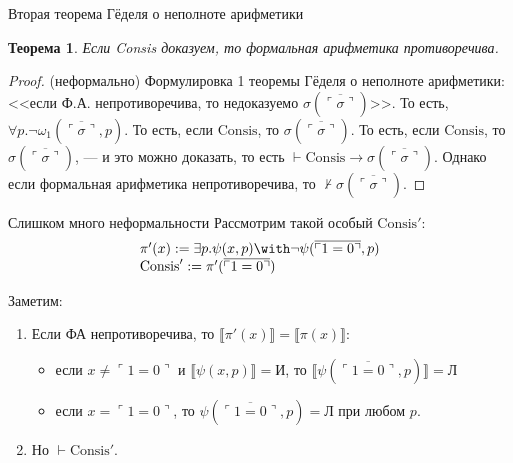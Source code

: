 \documentclass[aspectratio=169]{beamer}
\newtheorem{thm}{Теорема}[section]
\begin{document}
\begin{frame}{Вторая теорема Гёделя о неполноте арифметики}
\begin{thm}Если Consis доказуем, то формальная арифметика противоречива.\end{thm}
\begin{proof}(неформально) \pause
Формулировка 1 теоремы Гёделя о неполноте арифметики: 
<<если Ф.А. непротиворечива, то недоказуемо $\sigma(\overline{\ulcorner\sigma\urcorner})$>>. \pause
То есть, $\forall p.\neg\omega_1(\overline{\ulcorner\sigma\urcorner},p)$. \pause То есть, 
если $\text{Consis}$, то $\sigma(\overline{\ulcorner\sigma\urcorner})$. \pause
То есть, если $\text{Consis}$, то $\sigma(\overline{\ulcorner\sigma\urcorner})$, --- и это можно доказать,
то есть $\vdash\text{Consis}\rightarrow\sigma(\overline{\ulcorner\sigma\urcorner})$. \pause Однако
если формальная арифметика непротиворечива, то $\not\vdash\sigma(\overline{\ulcorner\sigma\urcorner})$.
\end{proof}
\end{frame}

\begin{frame}{Слишком много неформальности}
Рассмотрим такой особый $\text{Consis}'$:
$$\begin{array}{l}\pi'(x) := \exists p.\psi(x,p) \with \neg\psi(\overline{\ulcorner 1 = 0 \urcorner},p)\\
                  \text{Consis}' := \pi'(\overline{\ulcorner 1 = 0 \urcorner})\end{array}$$

Заметим:
\begin{enumerate}
\item Если ФА непротиворечива, то $\llbracket \pi'(x) \rrbracket = \llbracket \pi(x) \rrbracket$:
\begin{itemize}
\item если $x \ne \ulcorner 1 = 0 \urcorner$ и $\llbracket\psi(x,p)\rrbracket = \text{И}$, 
то $\llbracket\psi(\overline{\ulcorner 1 = 0\urcorner},p)\rrbracket = \text{Л}$
\item если $x = \ulcorner 1 = 0 \urcorner$, то $\psi(\overline{\ulcorner 1 = 0 \urcorner},p) = \text{Л}$ при любом $p$.
\end{itemize}
\item Но $\vdash \text{Consis}'$.
\end{enumerate}
\end{frame}
\end{document}
